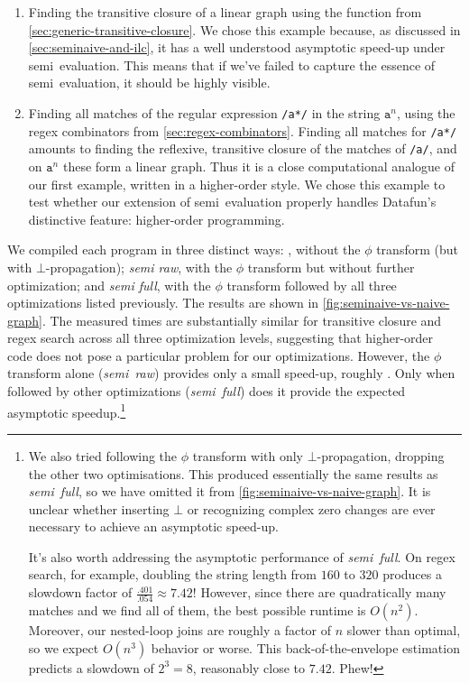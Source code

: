 \begin{enumerate}
\item Finding the transitive closure of a linear graph using the 
  function from \cref{sec:generic-transitive-closure}. We chose this example
  because, as discussed in \cref{sec:seminaive-and-ilc}, it has a well
  understood asymptotic speed-up under semi\naive\ evaluation. This means that
  if we've failed to capture the essence of semi\naive\ evaluation, it should be
  highly visible.

\item Finding all matches of the regular expression \texttt{/a*/} in the string
  $\texttt{a}^n$, using the regex combinators from \cref{sec:regex-combinators}.
  Finding all matches for \texttt{/a*/} amounts to finding the reflexive,
  transitive closure of the matches of \texttt{/a/}, and on $\texttt{a}^n$ these
  form a linear graph. Thus it is a close computational analogue of our first
  example, written in a higher-order style. We chose this example to test
  whether our extension of semi\naive\ evaluation properly handles Datafun's
  distinctive feature: higher-order programming.
\end{enumerate}

We compiled each program in three distinct ways: \emph{\naive{}}, without the
$\phi$ transform (but with $\bot$-propagation); \emph{semi\naive{} raw}, with
the $\phi$ transform but without further optimization; and \emph{semi\naive{}
  full}, with the $\phi$ transform followed by all three optimizations listed
previously. The results are shown in \cref{fig:seminaive-vs-naive-graph}.
%
The measured times are substantially similar for transitive closure and regex
search across all three optimization levels, suggesting that higher-order code
does not pose a particular problem for our optimizations. However, the $\phi$
transform alone (\emph{semi\naive\ raw}) provides only a small speed-up, roughly
. Only when followed by other optimizations
(\emph{semi\naive\ full}) does it provide the expected asymptotic
speedup.\footnote{We also tried following the $\phi$ transform with only
  $\bot$-propagation, dropping the other two optimisations. This produced
  essentially the same results as \emph{semi\naive\ full}, so we have omitted it
  from \cref{fig:seminaive-vs-naive-graph}. It is unclear whether inserting
  $\bot$ or recognizing complex zero changes are ever necessary to achieve an
  asymptotic speed-up.

  It's also worth addressing the asymptotic performance of
  \emph{semi\naive\ full}. On regex search, for example, doubling the string
  length from $160$ to $320$ produces a slowdown factor of $\frac{.401}{.054}
  \approx 7.42$! However, since there are quadratically many matches and we find
  all of them, the best possible runtime is $O(n^2)$. Moreover, our nested-loop
  joins are roughly a factor of $n$ slower than optimal, so we expect $O(n^3)$
  behavior or worse. This back-of-the-envelope estimation predicts a slowdown of
  $2^3 = 8$, reasonably close to $7.42$. Phew!}

